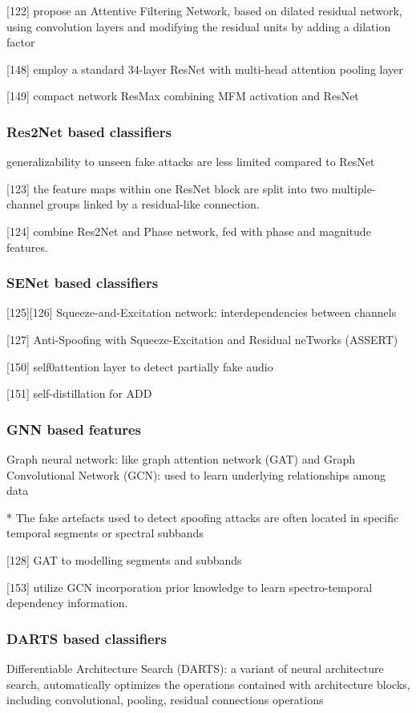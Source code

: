 \documentclass{article}
\begin{document}
[122] propose an Attentive Filtering Network, based on dilated residual network, using convolution layers and modifying the residual units by adding a dilation factor

[148] employ a standard 34-layer ResNet with multi-head attention pooling layer

[149] compact network ResMax combining MFM activation and ResNet

\subsubsection{Res2Net based classifiers}
generalizability to unseen fake attacks are less limited compared to ResNet

[123] the feature maps within one ResNet block are split into two multiple-channel groups linked by a residual-like connection. 

[124] combine Res2Net and Phase network, fed with phase and magnitude features. 

\subsubsection{SENet based classifiers}

[125][126] Squeeze-and-Excitation network: interdependencies between channels

[127] Anti-Spoofing with Squeeze-Excitation and Residual neTworks (ASSERT)

[150] self0attention layer to detect partially fake audio

[151] self-distillation for ADD

\subsubsection{GNN based features}
Graph neural network: like graph attention network (GAT) and Graph Convolutional Network (GCN): used to learn underlying relationships among data

* The fake artefacts used to detect spoofing attacks are often located in specific temporal segments or spectral subbands

[128] GAT to modelling segments and subbands

[153] utilize GCN incorporation prior knowledge to learn spectro-temporal dependency information. 

\subsubsection{DARTS based classifiers}
Differentiable Architecture Search (DARTS): a variant of neural architecture search, automatically optimizes the operations contained with architecture blocks, including convolutional, pooling, residual connections operations
\end{document}
